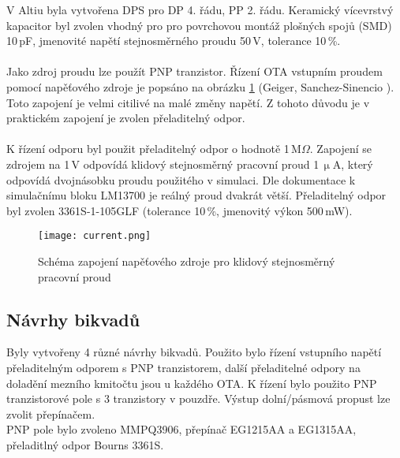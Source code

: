 \noindent V Altiu byla vytvořena DPS pro DP 4. řádu, PP 2. řádu. Keramický vícevrstvý kapacitor byl zvolen vhodný pro pro povrchovou montáž plošných spojů (SMD) 10\,pF, jmenovité napětí stejnosměrného proudu 50\,V, tolerance 10\,\%. \\
\\
Jako zdroj proudu lze použít PNP tranzistor. Řízení OTA vstupním proudem pomocí napěťového zdroje je popsáno na obrázku \ref{s:DC} (Geiger, Sanchez-Sinencio \cite{25}). Toto zapojení je velmi citilivé na malé změny napětí. Z tohoto důvodu je v praktickém zapojení je zvolen přeladitelný odpor. \\
\\
K řízení odporu byl použit přeladitelný odpor o hodnotě 1\,M$\Omega$. Zapojení se zdrojem na 1\,V odpovídá klidový stejnosměrný pracovní proud 1\,$\upmu$A, který odpovídá dvojnásobku proudu použitého v simulaci. Dle dokumentace k simulačnímu bloku LM13700 je reálný proud dvakrát větší. Přeladitelný odpor byl zvolen 3361S-1-105GLF (tolerance 10\,\%, jmenovitý výkon 500\,mW). 
\begin{figure}[h]
\centering
\texttt{[image: current.png]}
\caption{Schéma zapojení napěťového zdroje pro klidový stejnosměrný pracovní proud \label{s:DC}}
\end{figure}
\subsection{Návrhy bikvadů}
\noindent Byly vytvořeny 4 různé návrhy bikvadů. Použito bylo řízení vstupního napětí přeladitelným odporem s PNP tranzistorem, další přeladitelné odpory na doladění mezního kmitočtu jsou u každého OTA. K řízení bylo použito PNP tranzistorové pole s 3 tranzistory v pouzdře. Výstup dolní/pásmová propust lze zvolit přepínačem.\\
\noindent PNP pole bylo zvoleno MMPQ3906, přepínač EG1215AA a EG1315AA, přeladitlný odpor Bourns 3361S.